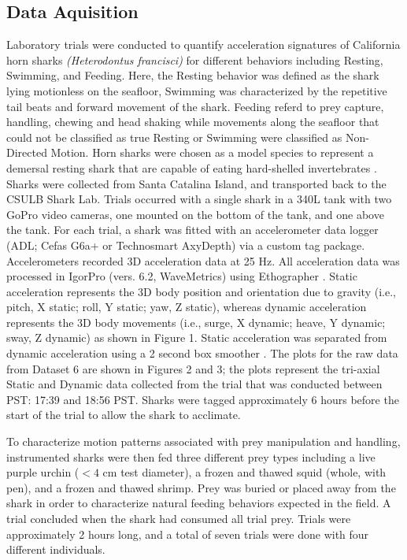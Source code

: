 \documentclass[conference]{IEEEtran}
\begin{document}
\subsection{Data Aquisition}
Laboratory trials were conducted to quantify acceleration signatures of California horn sharks \textit{(Heterodontus francisci)} for different behaviors including Resting, Swimming, and Feeding. Here, the Resting behavior was defined as the shark lying motionless on the seafloor, Swimming was characterized by the repetitive tail beats and forward movement of the shark. Feeding referd to prey capture, handling, chewing and head shaking while movements along the seafloor that could not be classified as true Resting or Swimming were classified as Non-Directed Motion. Horn sharks were chosen as a model species to represent a demersal resting shark that are capable of eating hard-shelled invertebrates \cite{8, 9, 10}. Sharks were collected from Santa Catalina Island, and transported back to the CSULB Shark Lab. Trials occurred with a single shark in a 340L tank with two GoPro video cameras, one mounted on the bottom of the tank, and one above the tank. For each trial, a shark was fitted with an accelerometer data logger (ADL; Cefas G6a+ or Technosmart AxyDepth) via a custom tag package. Accelerometers recorded 3D acceleration data at 25 Hz. All acceleration data was processed in IgorPro (vers. 6.2, WaveMetrics) using Ethographer \cite{11}. Static acceleration represents the 3D body position and orientation due to gravity (i.e., pitch, X static; roll, Y static; yaw, Z static), whereas dynamic acceleration represents the 3D body movements (i.e., surge, X dynamic; heave, Y dynamic; sway, Z dynamic) as shown in Figure 1. Static acceleration was separated from dynamic acceleration using a 2 second box smoother \cite{12}. The plots for the raw data from Dataset 6 are shown in Figures 2 and 3; the plots represent the tri-axial Static and Dynamic data collected from the trial that was conducted between PST: 17:39 and 18:56 PST. Sharks were tagged approximately 6 hours before the start of the trial to allow the shark to acclimate. 

To characterize motion patterns associated with prey manipulation and handling, instrumented sharks were then fed three different prey types including a live purple urchin ($<4$ cm test diameter), a frozen and thawed squid (whole, with pen), and a frozen and thawed shrimp. Prey was buried or placed away from the shark in order to characterize natural feeding behaviors expected in the field. A trial concluded when the shark had consumed all trial prey. Trials were approximately 2 hours long, and a total of seven trials were done with four different individuals. 
\end{document}
